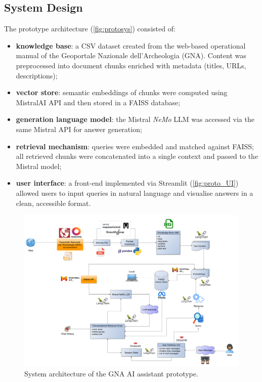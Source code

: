 \begin{spacing}{1.5}
\subsection{System Design}
The prototype architecture (\autoref{fig:protosys}) consisted of:
\begin{itemize}
      \item \textbf{knowledge base}: a CSV dataset created from the web-based operational manual of the Geoportale Nazionale dell’Archeologia (GNA). Content was preprocessed into document chunks enriched with metadata (titles, URLs, descriptions);
      \item \textbf{vector store}: semantic embeddings of chunks were computed using MistralAI API and then stored in a FAISS database;
      \item \textbf{generation language model}: the Mistral \textit{NeMo} LLM was accessed via the same Mistral API for answer generation;
      \item \textbf{retrieval mechanism}: queries were embedded and matched against FAISS; all retrieved chunks were concatenated into a single context and passed to the Mistral model;
      \item \textbf{user interface}: a front-end implemented via Streamlit (\autoref{fig:proto_UI}) allowed users to input queries in natural language and visualise answers in a clean, accessible format.
\end{itemize}


\begin{figure}[H]
  \centering
  \includegraphics[width=\textwidth]{images/prototype_diagram.png} 
  \caption{System architecture of the GNA AI assistant prototype.}
  \label{fig:protosys}
\end{figure}


\end{spacing}
